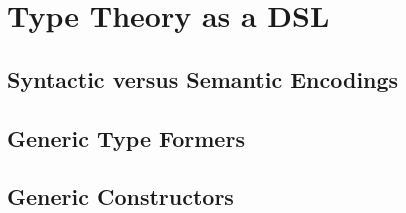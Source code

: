 \documentclass[12pt]{report}
\theoremstyle{definition}
\theoremstyle{remark}
\numberwithin{definition}{section}
\numberwithin{equation}{section}
\numberwithin{proposition}{section}
\numberwithin{conjecture}{section}
\numberwithin{theorem}{section}
\numberwithin{lemma}{section}
\numberwithin{corollary}{section}
\numberwithin{example}{section}
\numberwithin{remark}{section}
\begin{document}


\chapter{Type Theory as a DSL}\label{ch:gelim}

\section{Syntactic versus Semantic Encodings}
\section{Generic Type Formers}
\section{Generic Constructors}
\end{document}
